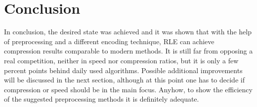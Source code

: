 \section{Conclusion}
\label{ch:Evaluation:sec:Conclusion}
\par{
In conclusion, the desired state was achieved and it was shown that with the help of preprocessing and a different encoding technique, RLE can achieve compression results comparable to modern methods. It is still far from opposing a real competition, neither in speed nor compression ratios, but it is only a few percent points behind daily used algorithms. Possible additional improvements will be discussed in the next section, although at this point one has to decide if compression or speed should be in the main focus. Anyhow, to show the efficiency of the suggested preprocessing methods it is definitely adequate.
}
